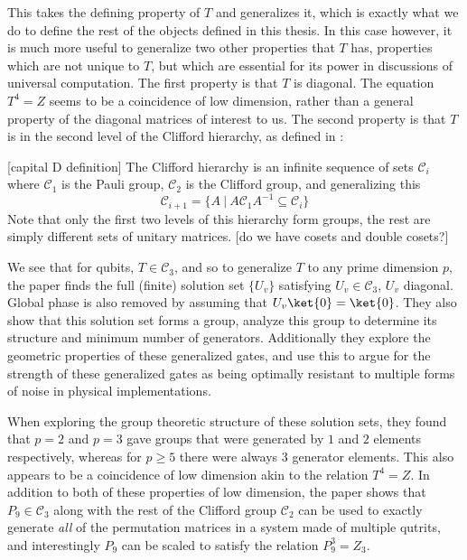This takes the defining property of $T$ and generalizes it, which is exactly what we do to define the rest of the objects defined in this thesis. In this case however, it is much more useful to generalize two other properties that $T$ has, properties which are not unique to $T$, but which are essential for its power in discussions of universal computation. The first property is that $T$ is diagonal. The equation $T^4 = Z$ seems to be a coincidence of low dimension, rather than a general property of the diagonal matrices of interest to us. The second property is that $T$ is in the second level of the Clifford hierarchy, as defined in \cite{clifford-hierarchy}:

[capital D definition] The Clifford hierarchy is an infinite sequence of sets $\mathcal{C}_i$ where $\mathcal{C}_1$ is the Pauli group, $\mathcal{C}_2$ is the Clifford group, and generalizing this
\[\mathcal{C}_{i+1} = \{A\ |\ A\mathcal{C}_1A^{-1} \subseteq \mathcal{C}_i\}\]
Note that only the first two levels of this hierarchy form groups, the rest are simply different sets of unitary matrices.
[do we have cosets and double cosets?]

We see that for qubits, $T \in \mathcal{C}_3$, and so to generalize $T$ to any prime dimension $p$, the paper \cite{pi-over-eight} finds the full (finite) solution set $\{U_v\}$ satisfying $U_v \in \mathcal{C}_3$, $U_v$ diagonal. Global phase is also removed by assuming that $U_v\ket{0} = \ket{0}$. They also show that this solution set forms a group, analyze this group to determine its structure and minimum number of generators. Additionally they explore the geometric properties of these generalized gates, and use this to argue for the strength of these generalized gates as being optimally resistant to multiple forms of noise in physical implementations.

When exploring the group theoretic structure of these solution sets, they found that $p = 2$ and $p = 3$ gave groups that were generated by $1$ and $2$ elements respectively, whereas for $p \geq 5$ there were always $3$ generator elements. This also appears to be a coincidence of low dimension akin to the relation $T^4 = Z$. In addition to both of these properties of low dimension, the paper \cite{arithmetics} shows that $P_9 \in \mathcal{C}_3$ along with the rest of the Clifford group $\mathcal{C}_2$ can be used to exactly generate \emph{all} of the permutation matrices in a system made of multiple qutrits, and interestingly $P_9$ can be scaled to satisfy the relation $P_9^3 = Z_3$.
